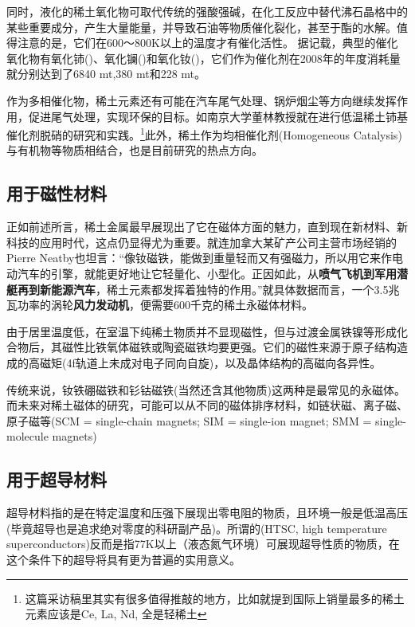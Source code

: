 同时，液化的稀土氧化物可取代传统的强酸强碱，在化工反应中替代沸石晶格中的某些重要成分，产生大量能量，并导致石油等物质催化裂化，甚至于酯的水解。值得注意的是，它们在600～800K以上的温度才有催化活性。\cite{JohnHamiltonWalrod_2012,金文_2015}
据记载，典型的催化氧化物有氧化铈()、氧化镧()和氧化钕()，它们作为催化剂在2008年的年度消耗量就分别达到了6840 mt,380 mt和228 mt。\cite{Atwood_2012a}

作为多相催化物，稀土元素还有可能在汽车尾气处理、锅炉烟尘等方向继续发挥作用，促进尾气处理，实现环保的目标。如南京大学董林教授就在进行低温稀土铈基催化剂脱硝的研究和实践。\cite{张晔_2019}\footnote{这篇采访稿里其实有很多值得推敲的地方，比如就提到国际上销量最多的稀土元素应该是Ce, La, Nd, 全是轻稀土}此外，稀土作为均相催化剂(Homogeneous Catalysis)与有机物等物质相结合，也是目前研究的热点方向。\cite{Yao_2012a}

\subsection{用于磁性材料}

正如前述所言，稀土金属最早展现出了它在磁体方面的魅力，直到现在新材料、新科技的应用时代，这点仍显得尤为重要。就连加拿大某矿产公司主营市场经销的Pierre Neatby也坦言：“像钕磁铁，能做到重量轻而又有强磁力，所以用它来作电动汽车的引擎，就能更好地让它轻量化、小型化。正因如此，从\textbf{喷气飞机到军用潜艇再到新能源汽车}，稀土元素都发挥着独特的作用。”\cite{Kirkpatrick_2019}就具体数据而言，一个3.5兆瓦功率的涡轮\textbf{风力发动机}，便需要600千克的稀土永磁体材料。\cite{Atwood_2012a}

由于居里温度低，在室温下纯稀土物质并不显现磁性，但与过渡金属铁镍等形成化合物后，其磁性比铁氧体磁铁或陶瓷磁铁均要更强。它们的磁性来源于原子结构造成的高磁矩(4f轨道上未成对电子同向自旋)，以及晶体结构的高磁向各异性。

传统来说，钕铁硼磁铁和钐钴磁铁(当然还含其他物质)这两种是最常见的永磁体。而未来对稀土磁体的研究，可能可以从不同的磁体排序材料，如链状磁、离子磁、原子磁等(SCM = single-chain magnets; SIM = single-ion
magnet; SMM = single-molecule magnets)\cite{Wang_2012a,Wang_2012}

\subsection{用于超导材料}

超导材料指的是在特定温度和压强下展现出零电阻的物质，且环境一般是低温高压(毕竟超导也是追求绝对零度的科研副产品)。所谓的(HTSC, high temperature superconductors)反而是指77K以上（液态氮气环境）可展现超导性质的物质，在这个条件下的超导将具有更为普遍的实用意义。

